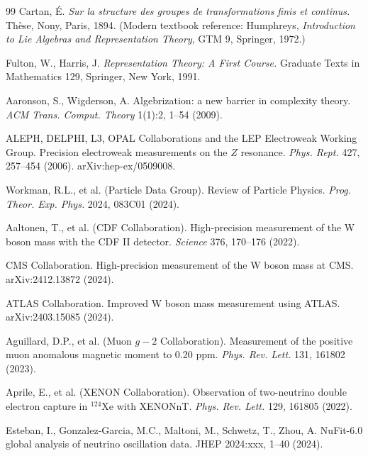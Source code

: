 \documentclass[11pt,a4paper]{amsart}
\theoremstyle{plain}
\theoremstyle{definition}
\begin{document}
\begin{thebibliography}{99}
Cartan, \'E.
\newblock \emph{Sur la structure des groupes de transformations finis et continus.}
\newblock Th\`ese, Nony, Paris, 1894. (Modern textbook reference: Humphreys, \emph{Introduction to Lie Algebras and Representation Theory}, GTM 9, Springer, 1972.)

Fulton, W., Harris, J.
\newblock \emph{Representation Theory: A First Course.}
\newblock Graduate Texts in Mathematics 129, Springer, New York, 1991.

Aaronson, S., Wigderson, A.
\newblock Algebrization: a new barrier in complexity theory.
\newblock \emph{ACM Trans. Comput. Theory} 1(1):2, 1--54 (2009).

ALEPH, DELPHI, L3, OPAL Collaborations and the LEP Electroweak Working Group.
\newblock Precision electroweak measurements on the $Z$ resonance.
\newblock \emph{Phys. Rept.} 427, 257--454 (2006). arXiv:hep-ex/0509008.

Workman, R.L., et al. (Particle Data Group).
\newblock Review of Particle Physics.
\newblock \emph{Prog. Theor. Exp. Phys.} 2024, 083C01 (2024).

Aaltonen, T., et al. (CDF Collaboration).
\newblock High-precision measurement of the W boson mass with the CDF II detector.
\newblock \emph{Science} 376, 170--176 (2022).

CMS Collaboration.
\newblock High-precision measurement of the W boson mass at CMS.
\newblock arXiv:2412.13872 (2024).

ATLAS Collaboration.
\newblock Improved W boson mass measurement using ATLAS.
\newblock arXiv:2403.15085 (2024).

Aguillard, D.P., et al. (Muon $g-2$ Collaboration).
\newblock Measurement of the positive muon anomalous magnetic moment to 0.20 ppm.
\newblock \emph{Phys. Rev. Lett.} 131, 161802 (2023).

Aprile, E., et al. (XENON Collaboration).
\newblock Observation of two-neutrino double electron capture in $^{124}$Xe with XENONnT.
\newblock \emph{Phys. Rev. Lett.} 129, 161805 (2022).

Esteban, I., Gonzalez-Garcia, M.C., Maltoni, M., Schwetz, T., Zhou, A.
\newblock NuFit-6.0 global analysis of neutrino oscillation data.
\newblock JHEP 2024:xxx, 1--40 (2024).


\end{thebibliography}
\end{document}

